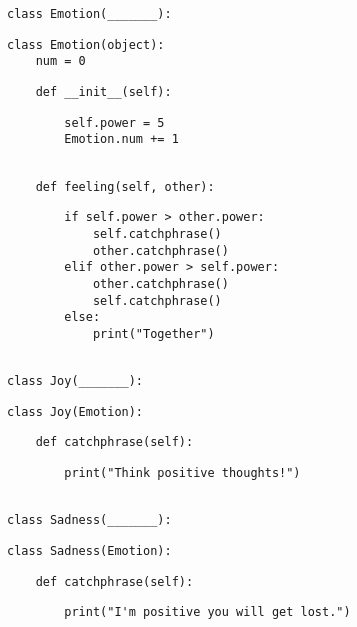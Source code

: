 \begin{blocksection}
\begin{lstlisting}
class Emotion(_______):
\end{lstlisting}
\begin{solution}[.5in]
\begin{lstlisting}
class Emotion(object):
    num = 0
\end{lstlisting}
\end{solution}
\begin{lstlisting}
    def __init__(self):
\end{lstlisting}
\begin{solution}[.80in]
\begin{lstlisting}
        self.power = 5
        Emotion.num += 1
\end{lstlisting}
\end{solution}
\begin{lstlisting}

    def feeling(self, other):
\end{lstlisting}
\begin{solution}[2.3in]
\begin{lstlisting}
        if self.power > other.power:
            self.catchphrase()
            other.catchphrase()
        elif other.power > self.power:
            other.catchphrase()
            self.catchphrase()
        else:
            print("Together")
\end{lstlisting}
\end{solution}
\begin{lstlisting}

class Joy(_______):
\end{lstlisting}
\begin{solution}[0in]
\begin{lstlisting}
class Joy(Emotion):
\end{lstlisting}
\end{solution}
\begin{lstlisting}
    def catchphrase(self):
\end{lstlisting}
\begin{solution}[0.55in]
\begin{lstlisting}
        print("Think positive thoughts!")
\end{lstlisting}
\end{solution}
\begin{lstlisting}

class Sadness(_______):
\end{lstlisting}
\begin{solution}[0in]
\begin{lstlisting}
class Sadness(Emotion):
\end{lstlisting}
\end{solution}
\begin{lstlisting}
    def catchphrase(self):
\end{lstlisting}
\begin{solution}[0.55in]
\begin{lstlisting}
        print("I'm positive you will get lost.")
\end{lstlisting}
\end{solution}
\end{blocksection}
